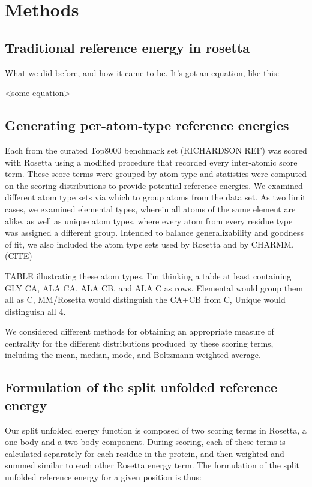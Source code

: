 \section{Methods}
\subsection{Traditional reference energy in rosetta}
What we did before, and how it came to be. It's got an equation, like this:

<some equation>


\subsection{Generating per-atom-type reference energies}

Each from the curated Top8000 benchmark set (RICHARDSON REF) was scored with Rosetta using a modified procedure that recorded every inter-atomic score term. These score terms were grouped by atom type and statistics were computed on the scoring distributions to provide potential reference energies. We examined different atom type sets via which to group atoms from the data set. As two limit cases, we examined elemental types, wherein all atoms of the same element are alike, as well as unique atom types, where every atom from every residue type was assigned a different group. Intended to balance generalizability and goodness of fit, we also included the atom type sets used by Rosetta and by CHARMM.(CITE)

TABLE illustrating these atom types. I'm thinking a table at least containing GLY CA, ALA CA, ALA CB, and ALA C as rows. Elemental would group them all as C, MM/Rosetta would distinguish the CA+CB from C, Unique would distinguish all 4.

We considered different methods for obtaining an appropriate measure of centrality for the different distributions produced by these scoring terms, including the mean, median, mode, and Boltzmann-weighted average.


\subsection{Formulation of the split unfolded reference energy}
Our split unfolded energy function is composed of two scoring terms in Rosetta, a one body and a two body component. During scoring, each of these terms is calculated separately for each residue in the protein, and then weighted and summed similar to each other Rosetta energy term. The formulation of the split unfolded reference energy for a given position is thus:

